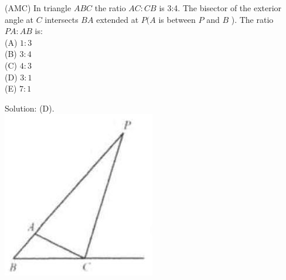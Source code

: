 \documentclass{article}
\begin{document}
(AMC) In triangle \(A B C\) the ratio \(A C: C B\) is 3:4. The bisector of the exterior angle at \(C\) intersects \(B A\) extended at \(P(A\) is between \(P\) and \(B\) ). The ratio \(P A: A B\) is:\\
(A) \(1: 3\)\\
(B) \(3: 4\)\\
(C) \(4: 3\)\\
(D) \(3: 1\)\\
(E) \(7: 1\)

Solution: (D).\\
\centering
\includegraphics[width=\textwidth]{images/055(2).jpg}
\end{document}
